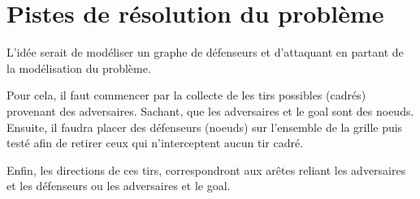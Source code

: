 \documentclass{article}
\begin{document}

\section{Pistes de résolution du problème}
L'idée serait de modéliser un graphe de défenseurs et d'attaquant en partant de la modélisation du problème.

Pour cela, il faut commencer par la collecte de les tirs possibles (cadrés) provenant des adversaires. Sachant, que les adversaires et le goal sont des noeuds. 
Ensuite, il faudra placer des défenseurs (noeuds) sur l'ensemble de la grille puis testé afin de retirer ceux qui n'interceptent aucun tir cadré.

Enfin, les directions de ces tirs, correspondront aux arêtes reliant les adversaires et les défenseurs ou les adversaires et le goal.

\end{document}
